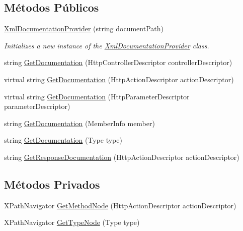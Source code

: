 \subsection*{Métodos Públicos}
\begin{DoxyCompactItemize}
\item 
\hyperlink{classApi3Layers_1_1Areas_1_1HelpPage_1_1XmlDocumentationProvider_ad2a409539874ae63a8cebe23599fc468}{Xml\+Documentation\+Provider} (string document\+Path)
\begin{DoxyCompactList}\small\item\em Initializes a new instance of the \hyperlink{classApi3Layers_1_1Areas_1_1HelpPage_1_1XmlDocumentationProvider}{Xml\+Documentation\+Provider} class. \end{DoxyCompactList}\item 
string \hyperlink{classApi3Layers_1_1Areas_1_1HelpPage_1_1XmlDocumentationProvider_a6bf162425448d82a33aa596c66c807e0}{Get\+Documentation} (Http\+Controller\+Descriptor controller\+Descriptor)
\item 
virtual string \hyperlink{classApi3Layers_1_1Areas_1_1HelpPage_1_1XmlDocumentationProvider_aaa833c04f0d8aecd147d9755e20106e2}{Get\+Documentation} (Http\+Action\+Descriptor action\+Descriptor)
\item 
virtual string \hyperlink{classApi3Layers_1_1Areas_1_1HelpPage_1_1XmlDocumentationProvider_a7222394a33fd0f7cf2117e37d7e43dc3}{Get\+Documentation} (Http\+Parameter\+Descriptor parameter\+Descriptor)
\item 
string \hyperlink{classApi3Layers_1_1Areas_1_1HelpPage_1_1XmlDocumentationProvider_aa774bb352a769421583abb335a1cec8a}{Get\+Documentation} (Member\+Info member)
\item 
string \hyperlink{classApi3Layers_1_1Areas_1_1HelpPage_1_1XmlDocumentationProvider_af771cd863288942e506d28447daf4f82}{Get\+Documentation} (Type type)
\item 
string \hyperlink{classApi3Layers_1_1Areas_1_1HelpPage_1_1XmlDocumentationProvider_a418513d2d192474340e81271a0b4ca5f}{Get\+Response\+Documentation} (Http\+Action\+Descriptor action\+Descriptor)
\end{DoxyCompactItemize}
\subsection*{Métodos Privados}
\begin{DoxyCompactItemize}
\item 
X\+Path\+Navigator \hyperlink{classApi3Layers_1_1Areas_1_1HelpPage_1_1XmlDocumentationProvider_ada0fcccbdb5b3153540e07182fe9179a}{Get\+Method\+Node} (Http\+Action\+Descriptor action\+Descriptor)
\item 
X\+Path\+Navigator \hyperlink{classApi3Layers_1_1Areas_1_1HelpPage_1_1XmlDocumentationProvider_a8db80d23eb6731ae9ed3e9f1bde27440}{Get\+Type\+Node} (Type type)
\end{DoxyCompactItemize}
